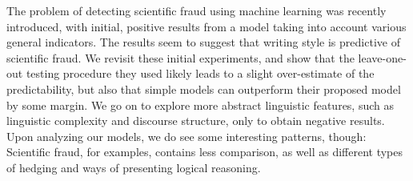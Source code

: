 The problem of detecting scientific fraud using machine learning was recently introduced, with initial, positive results from a model taking into account various general indicators. The results seem to suggest that writing style is predictive of scientific fraud. We revisit these initial experiments, and show that the leave-one-out testing procedure they used likely leads to a slight over-estimate of the predictability, but also that simple models can outperform their proposed model by some margin. We go on to explore more abstract linguistic features, such as linguistic complexity and discourse structure, only to obtain negative results. Upon analyzing our models, we do see some interesting patterns, though: Scientific fraud, for examples, contains less comparison, as well as different types of hedging and ways of presenting logical reasoning.
